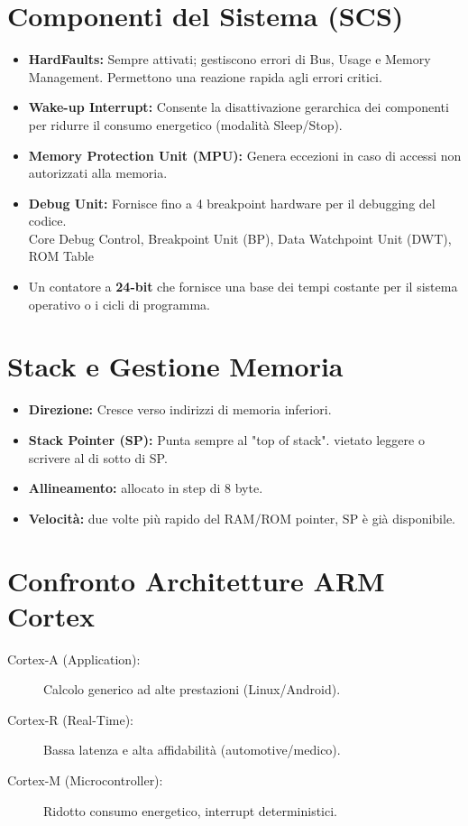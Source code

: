 
\section{Componenti del Sistema (SCS)}

\begin{itemize}
    \item \textbf{HardFaults:} Sempre attivati; gestiscono errori di Bus, Usage e Memory Management. Permettono una reazione rapida agli errori critici.
    \item \textbf{Wake-up Interrupt:} Consente la disattivazione gerarchica dei componenti
     per ridurre il consumo energetico (modalità Sleep/Stop).
    \item \textbf{Memory Protection Unit (MPU):} Genera eccezioni in caso di accessi non autorizzati alla memoria.
    \item \textbf{Debug Unit:} Fornisce fino a 4 breakpoint hardware per il debugging del codice.\\
        Core Debug Control, Breakpoint Unit (BP), Data Watchpoint Unit (DWT), ROM Table
    \item Un contatore a \textbf{24-bit} che fornisce una base dei tempi costante per il sistema operativo o i cicli di programma.
\end{itemize}

\section{Stack e Gestione Memoria}
\begin{itemize}
    \item \textbf{Direzione:} Cresce verso indirizzi di memoria inferiori.
    \item \textbf{Stack Pointer (SP):} Punta sempre al "top of stack". vietato leggere o scrivere al di sotto di SP.
    \item \textbf{Allineamento:} allocato in step di 8 byte.
    \item \textbf{Velocità:} due volte più rapido del RAM/ROM pointer, SP è già disponibile.
\end{itemize}

\section{Confronto Architetture ARM Cortex}
\begin{description}
    \item[Cortex-A (Application):] Calcolo generico ad alte prestazioni (Linux/Android).
    \item[Cortex-R (Real-Time):] Bassa latenza e alta affidabilità (automotive/medico).
    \item[Cortex-M (Microcontroller):] Ridotto consumo energetico, interrupt deterministici.
\end{description}

